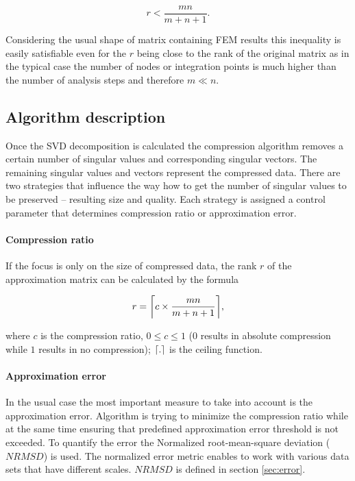 \begin{equation}
r<\frac{m n}{m+n+1}.
\label{eq:r-ineq}
\end{equation}

\noindent
Considering the usual shape of matrix containing FEM results this inequality is easily satisfiable even for the $r$ being close to the rank of the original matrix as in the typical case the number of nodes or integration points is much higher than the number of analysis steps and therefore $m \ll n$.

\subsection{Algorithm description}
Once the SVD decomposition is calculated the compression algorithm removes a certain number of singular values and corresponding singular vectors. The remaining singular values and vectors represent the compressed data. There are two strategies that influence the way how to get the number of singular values to be preserved -- resulting size and quality. Each strategy is assigned a control parameter that determines compression ratio or approximation error.

\paragraph{Compression ratio}
If the focus is only on the size of compressed data, the rank $r$ of the approximation matrix can be calculated by the formula

\begin{equation}
r=\ceil*{c \times \frac{m n}{m+n+1}},
\label{eq:rank-from-comp-ratio}
\end{equation}

\noindent
where $c$ is the compression ratio, $0 \leq c \leq 1$ ($0$ results in absolute compression while $1$ results in no compression); $\ceil*{.}$ is the ceiling function.

\paragraph{Approximation error}
In the usual case the most important measure to take into account is the approximation error. Algorithm is trying to minimize the compression ratio while at the same time ensuring that predefined approximation error threshold is not exceeded. To quantify the error the Normalized root-mean-square deviation ($\mathit{NRMSD}$) is used. The normalized error metric enables to work with various data sets that have different scales. $\mathit{NRMSD}$ is defined in section \ref{sec:error}.

